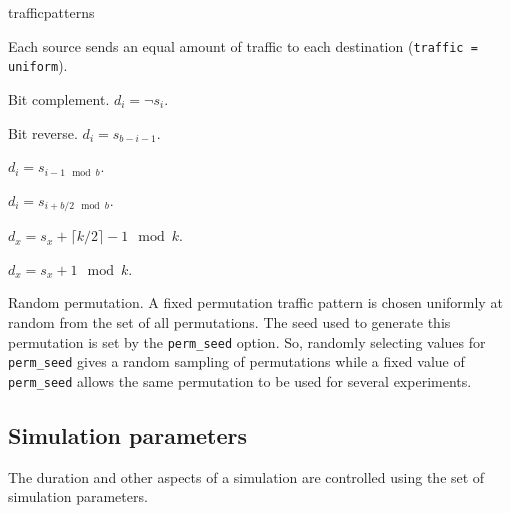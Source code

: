 \documentclass[11pt]{article}
\begin{document}
\begin{opt_list}{trafficpatterns}
\item[uniform] Each source sends an equal amount of traffic to each
destination (\texttt{traffic = uniform}).
\item[bitcomp] Bit complement. $d_i = \neg s_i$.
\item[bitrev] Bit reverse. $d_i = s_{b-i-1}$.
\item[shuffle] $d_i = s_{i-1 \mod b}$.
\item[transpose] $d_i = s_{i+b/2 \mod b}$.
\item[tornado] $d_x = s_x + \lceil k/2 \rceil - 1 \mod k$.
\item[neighbor] $d_x = s_x + 1 \mod k$.
\item[randperm] Random permutation.  A fixed permutation traffic
pattern is chosen uniformly at random from the set of all
permutations.  The seed used to generate this permutation is set by
the \texttt{perm\_seed} option.  So, randomly selecting values for
\texttt{perm\_seed} gives a random sampling of permutations while a
fixed value of \texttt{perm\_seed} allows the same permutation to be
used for several experiments.
\end{opt_list}

\subsection{Simulation parameters}
\label{sec:sim_params}

The duration and other aspects of a simulation are controlled using
the set of simulation parameters.
\end{document}
